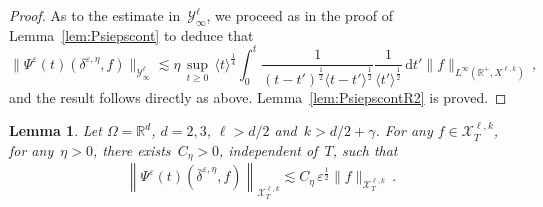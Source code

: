 \documentclass[11pt]{article}
\newtheorem{lemm}[theo]{Lemma}
\theoremstyle{definition}
\numberwithin{equation}{section}
\numberwithin{figure}{section}
\numberwithin{table}{section}
\newcommand*{\dd}{\mathrm{d}}
\newcommand*{\dt}{\dd t}
\newcommand*\R {\mathbb{R}}
\newcommand*\eps{{\varepsilon}}
\begin{document}
\begin{proof}
\goodbreak
As to the estimate in~$\mathcal{Y}^\ell_\infty$, we proceed as in the proof of Lemma~\ref{lem:Psiepscont} to deduce that
\[
\|\Psi^\eps(t) (\delta^{\eps,\eta},f) \|_{\mathcal{Y}^{\ell}_\infty} \lesssim \eta \, \sup_{t \ge 0} \, \langle t \rangle^{\frac14} \int_0^t \frac{1}{(t-t')^\frac12 \langle t-t' \rangle^\frac12} \frac{1}{\langle t' \rangle^\frac12} \, \dt' \|f\|_{L^\infty(\R^+,X^{\ell,k})} \,,
\]
and the result follows directly as above. Lemma~\ref{lem:PsiepscontR2} is proved.
\end{proof}

\begin{lemm}\label{lem:Psiepsbardelta}
Let $\Omega= \R^d$, $d=2,3$, $\ell>d/2$ and~${k>d/2+\gamma}$. For any $f \in \mathcal{X}^{\ell,k}_T$, for any~$\eta>0$, there exists~$C_\eta>0$, independent of~$T$, such that
\[
\left\|\Psi^\eps(t)(\bar \delta^{\eps,\eta},f)\right\|_{\mathcal{X}^{\ell,k}_T} \lesssim C_\eta \, \eps^\frac12 \|f\|_{\mathcal{X}^{\ell,k}_T} \,.
\]
\end{lemm}
\end{document}
